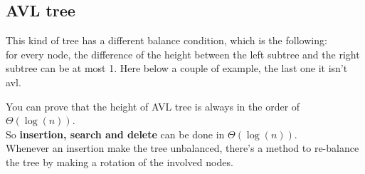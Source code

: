 \documentclass{article}
\begin{document}
\subsection{AVL tree}
This kind of tree has a different balance condition, which is the following:\\
for every node, the difference of the height between the left subtree and the right subtree can be at most 1. Here below a couple of example, the last one it isn't avl.\\
You can prove that the height of AVL tree is always in the order of $\Theta(\log(n))$.\\
So \textbf{insertion, search and delete} can be done in $\Theta(\log(n))$.\\
Whenever an insertion make the tree unbalanced, there's a method to re-balance the tree by making a rotation of the involved nodes. 
\end{document}

